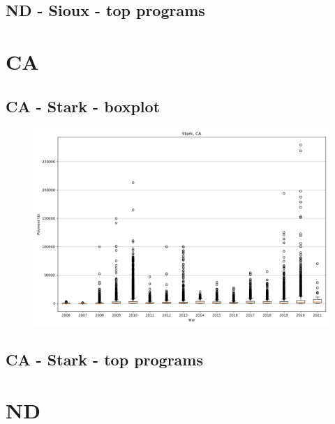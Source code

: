 \subsection*{ND - Sioux - top programs}

\newpage
\section*{CA}
\subsection*{CA - Stark - boxplot}
\begin{figure}[h]
\centering
\includegraphics[width=7in]{../output/boxplots/counties/Stark-CA_boxplot.png}
\end{figure}


\subsection*{CA - Stark - top programs}

\newpage
\section*{ND}
